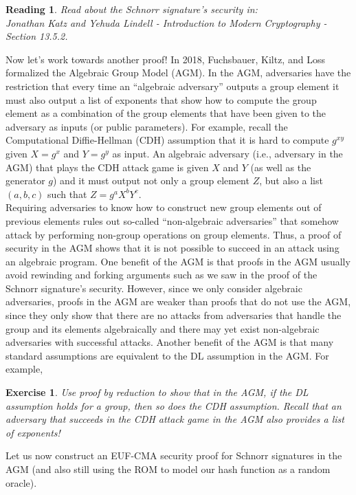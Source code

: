 \documentclass[12pt]{article}
\newtheorem{exercise}{Exercise}
\newtheorem{reading}{Reading}
\theoremstyle{definition}
\theoremstyle{remark}
\theoremstyle{definition}
\begin{document}
\begin{reading}
Read about the Schnorr signature's security in:\\
Jonathan Katz and Yehuda Lindell - Introduction to Modern Cryptography - Section 13.5.2.
\end{reading}

Now let's work towards another proof! In 2018, Fuchsbauer, Kiltz, and Loss formalized the Algebraic Group Model (AGM). In the AGM, adversaries have the restriction that every time an ``algebraic adversary'' outputs a group element it must also output a list of exponents that show how to compute the group element as a combination of the group elements that have been given to the adversary as inputs (or public parameters). For example, recall the Computational Diffie-Hellman (CDH) assumption that it is hard to compute $g^{xy}$ given $X = g^x$ and $Y = g^y$ as input. An algebraic adversary (i.e., adversary in the AGM) that plays the CDH attack game is given $X$ and $Y$ (as well as the generator $g$) and it must output not only a group element $Z$, but also a list $(a, b, c)$ such that $Z = g^aX^bY^c$.\\

Requiring adversaries to know how to construct new group elements out of previous elements rules out so-called ``non-algebraic adversaries'' that somehow attack by performing non-group operations on group elements. Thus, a proof of security in the AGM shows that it is not possible to succeed in an attack using an algebraic program. One benefit of the AGM is that proofs in the AGM usually avoid rewinding and forking arguments such as we saw in the proof of the Schnorr signature's security. However, since we only consider algebraic adversaries, proofs in the AGM are weaker than proofs that do not use the AGM, since they only show that there are no attacks from adversaries that handle the group and its elements algebraically and there may yet exist non-algebraic adversaries with successful attacks. Another benefit of the AGM is that many standard assumptions are equivalent to the DL assumption in the AGM. For example,

\begin{exercise}
Use proof by reduction to show that in the AGM, if the DL assumption holds for a group, then so does the CDH assumption. Recall that an adversary that succeeds in the CDH attack game in the AGM also provides a list of exponents!
\end{exercise}

Let us now construct an EUF-CMA security proof for Schnorr signatures in the AGM (and also still using the ROM to model our hash function as a random oracle).
\end{document}
